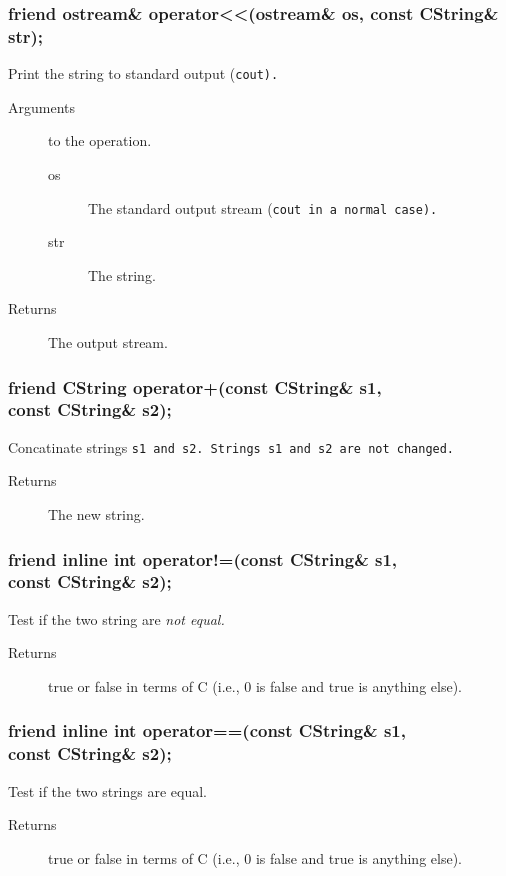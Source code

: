 \subsubsection{friend ostream\& operator<<(ostream\& os, 
                                           const CString\& str);}
Print the string to standard output (\tt cout\rm).
 \begin{description}
   \item [Arguments] to the operation.
     \begin{description}
       \item [os] The standard output stream (\tt cout \rm in a normal case).
       \item [str] The string.
     \end{description}
   \item [Returns] The output stream.
 \end{description}


\subsubsection{friend CString operator+(const CString\& s1,\\
                                        const CString\& s2);}
Concatinate strings \tt s1 \rm and \tt s2\rm. Strings \tt s1 \rm and
\tt s2 \rm are not changed. 
 \begin{description}
   \item [Returns] The new string.
 \end{description}

\subsubsection{friend inline int operator!=(const CString\& s1,\\
                                            const CString\& s2);}
Test if the two string are \it not \rm equal.

\begin{description}
   \item [Returns] true or false in terms of C (i.e., 0 is false and
                   true is anything else).
\end{description}

\subsubsection{friend inline int operator==(const CString\& s1,\\
                                              const CString\& s2);}
Test if the two strings are equal. 
\begin{description}
   \item [Returns] true or false in terms of C (i.e., 0 is false and
                   true is anything else).
\end{description}
